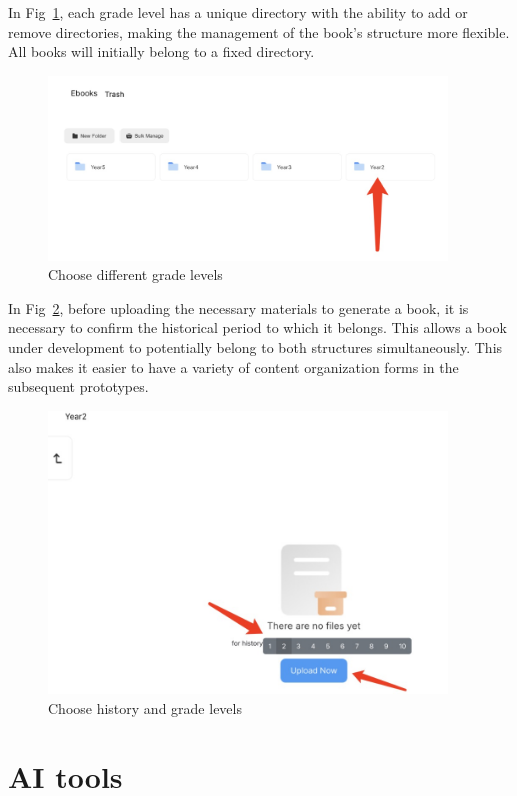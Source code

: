 In Fig~\ref{s-1}, each grade level has a unique directory with the ability to add or remove directories, making the management of the book's structure more flexible. All books will initially belong to a fixed directory.

\begin{figure}[htbp]
  \centerline{\includegraphics[width=300pt]{images/s-1.png}}
  \caption{Choose different grade levels}
  \label{s-1}
\end{figure}

In Fig~\ref{s-2}, before uploading the necessary materials to generate a book, it is necessary to confirm the historical period to which it belongs. This allows a book under development to potentially belong to both structures simultaneously. This also makes it easier to have a variety of content organization forms in the subsequent prototypes.

\begin{figure}[htbp]
  \centerline{\includegraphics[width=300pt]{images/s-2.jpg}}
  \caption{Choose history and grade levels}
  \label{s-2}
\end{figure}

\section{AI tools}

